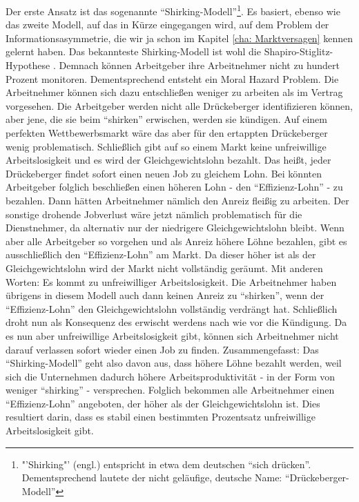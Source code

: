 Der erste Ansatz ist das sogenannte "`Shirking-Modell"'\footnote{"'Shirking"' (engl.) entspricht in etwa dem deutschen "`sich drücken"'. Dementsprechend lautete der nicht geläufige, deutsche Name: "`Drückeberger-Modell"'}. Es basiert, ebenso wie das zweite Modell, auf das in Kürze eingegangen wird, auf dem Problem der Informationsasymmetrie, die wir ja schon im Kapitel \ref{cha: Marktversagen} kennen gelernt haben. Das bekannteste Shirking-Modell ist wohl die Shapiro-Stiglitz-Hypothese \parencite{ShapiroStiglitz1984}. Demnach können Arbeitgeber ihre Arbeitnehmer nicht zu hundert Prozent monitoren. Dementsprechend entsteht ein Moral Hazard Problem. Die Arbeitnehmer können sich dazu entschließen weniger zu arbeiten als im Vertrag vorgesehen. Die Arbeitgeber werden nicht alle Drückeberger identifizieren können, aber jene, die sie beim "`shirken"' erwischen, werden sie kündigen. Auf einem perfekten Wettbewerbsmarkt wäre das aber für den ertappten Drückeberger wenig problematisch. Schließlich gibt auf so einem Markt keine unfreiwillige Arbeitslosigkeit und es wird der Gleichgewichtslohn bezahlt. Das heißt, jeder Drückeberger findet sofort einen neuen Job zu gleichem Lohn.  Bei \textcite{ShapiroStiglitz1984} könnten Arbeitgeber folglich beschließen einen höheren Lohn - den "`Effizienz-Lohn"' - zu bezahlen. Dann hätten Arbeitnehmer nämlich den Anreiz fleißig zu arbeiten. Der sonstige drohende Jobverlust wäre jetzt nämlich problematisch für die Dienstnehmer, da alternativ nur der niedrigere Gleichgewichtslohn bleibt. Wenn aber alle Arbeitgeber so vorgehen und als Anreiz höhere Löhne bezahlen, gibt es ausschließlich den "`Effizienz-Lohn"' am Markt. Da dieser höher ist als der Gleichgewichtslohn wird der Markt nicht vollständig geräumt. Mit anderen Worten: Es kommt zu unfreiwilliger Arbeitslosigkeit. Die Arbeitnehmer haben übrigens in diesem Modell auch dann keinen Anreiz zu "`shirken"', wenn der "`Effizienz-Lohn"' den Gleichgewichtslohn vollständig verdrängt hat. Schließlich droht nun als Konsequenz des erwischt werdens nach wie vor die Kündigung. Da es nun aber unfreiwillige Arbeitslosigkeit gibt, können sich Arbeitnehmer nicht darauf verlassen sofort wieder einen Job zu finden. Zusammengefasst: Das "`Shirking-Modell"' geht also davon aus, dass höhere Löhne bezahlt werden, weil sich die Unternehmen dadurch höhere Arbeitsproduktivität - in der Form von weniger "`shirking"' - versprechen. Folglich bekommen alle Arbeitnehmer einen "`Effizienz-Lohn"' angeboten, der höher als der Gleichgewichtslohn ist. Dies resultiert darin, dass es stabil einen bestimmten Prozentsatz unfreiwillige Arbeitslosigkeit gibt.

